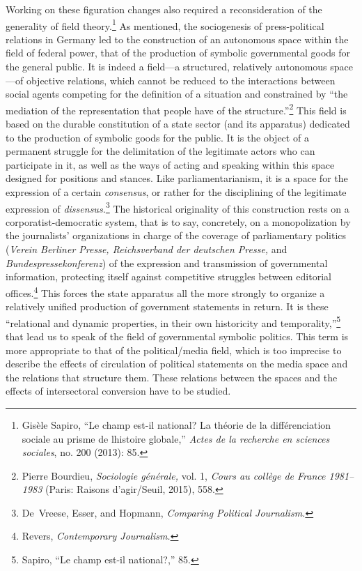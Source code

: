 \documentclass{tufte-handout}
\begin{document}
Working on these figuration changes also required a reconsideration of
the generality of field theory.\footnote{Gisèle Sapiro, ``Le champ
  est-il national? La théorie de la différenciation sociale au prisme de
  l\textquotesingle histoire globale,'' \emph{Actes de la recherche en
  sciences sociales}, no. 200 (2013): 85.} As mentioned, the
sociogenesis of press-political relations in Germany led to the
construction of an autonomous space within the field of federal power,
that of the production of symbolic governmental goods for the general
public. It is indeed a field---a structured, relatively autonomous
space---of objective relations, which cannot be reduced to the
interactions between social agents competing for the definition of a
situation and constrained by ``the mediation of the representation that
people have of the structure.''\footnote{Pierre Bourdieu,
  \emph{Sociologie générale,} vol. 1, \emph{Cours au collège de France
  1981--1983} (Paris: Raisons d'agir/Seuil, 2015), 558.} This field is
based on the durable constitution of a state sector (and its apparatus)
dedicated to the production of symbolic goods for the public. It is the
object of a permanent struggle for the delimitation of the legitimate
actors who can participate in it, as well as the ways of acting and
speaking within this space designed for positions and stances. Like
parliamentarianism, it is a space for the expression of a certain
\emph{consensus}, or rather for the disciplining of the legitimate
expression of \emph{dissensus.}\footnote{De~Vreese, Esser, and Hopmann,
  \emph{Comparing Political Journalism.}} The historical originality of
this construction rests on a corporatist-democratic system, that is to
say, concretely, on a monopolization by the journalists' organizations
in charge of the coverage of parliamentary politics (\emph{Verein
Berliner Presse, Reichsverband der deutschen Presse,} and
\emph{Bundespressekonferenz}) of the expression and transmission of
governmental information, protecting itself against competitive
struggles between editorial offices.\footnote{Revers, \emph{Contemporary
  Journalism.}} This forces the state apparatus all the more strongly to
organize a relatively unified production of government statements in
return. It is these ``relational and dynamic properties, in their own
historicity and temporality,''\footnote{Sapiro, ``Le champ est-il
  national?,'' 85.} that lead us to speak of the field of governmental
symbolic politics. This term is more appropriate to that of the
political/media field, which is too imprecise to describe the effects of
circulation of political statements on the media space and the relations
that structure them. These relations between the spaces and the effects
of intersectoral conversion have to be studied.
\end{document}

